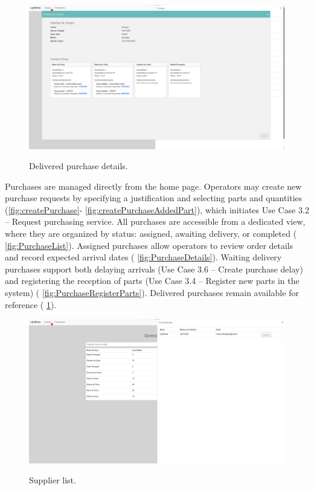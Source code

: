 \begin{figure}[h]
  \caption{Delivered purchase details.}
  \centering
  \includegraphics[width=\textwidth]{figs/Implementation/warehouse/PurchaseFinishedDetails}
  \label{fig:PurchaseFinishedDetails}
\end{figure}



Purchases are managed directly from the home page. Operators may create new purchase requests by specifying a justification and selecting parts and quantities (\ref{fig:createPurchase}- \ref{fig:createPurchaseAddedPart}), which initiates Use Case 3.2 – Request purchasing service. All purchases are accessible from a dedicated view, where they are organized by status: assigned, awaiting delivery, or completed ( \ref{fig:PurchaseList}). Assigned purchases allow operators to review order details and record expected arrival dates ( \ref{fig:PurchaseDetails}). Waiting delivery purchases support both delaying arrivals (Use Case 3.6 – Create purchase delay) and registering the reception of parts (Use Case 3.4 – Register new parts in the system) ( \ref{fig:PurchaseRegisterParts}). Delivered purchases remain available for reference ( \ref{fig:PurchaseFinishedDetails}).


\begin{figure}[h]
  \caption{Supplier list.}
  \centering
  \includegraphics[width=\textwidth]{figs/Implementation/warehouse/supplierList}
  \label{fig:supplierList}
\end{figure}


